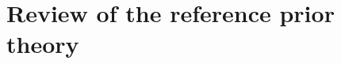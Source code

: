 \documentclass[a4paper]{book}
\begin{document}
\chapter*{Review of the reference prior theory}


\end{document}

